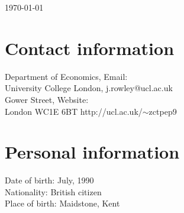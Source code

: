 \documentclass[margin,line]{res}
\makeatletter
\newcommand{\at}{\makeatletter @\makeatother}
\newcommand{\wavy}{\makeatletter $\sim$\makeatother}
\makeatother
\begin{document}
\begin{flushright}
{\small \today}
\end{flushright}
\begin{resume}
\section{\sc Contact information}
\begin{small}
Department of Economics, 												\hfill Email:\\
University College London,												\hfill j.rowley\at ucl.ac.uk\\
Gower Street, 															\hfill Website:\\
London WC1E 6BT															\hfill http://ucl.ac.uk/\wavy zctpep9\\
\end{small}
\section{\sc Personal information}
\begin{small}
\newlength{\myl}
\settowidth{\myl}{Date of birth: }
\newlength{\mym}
\settowidth{\mym}{Nationality: }
\newlength{\myn}
\settowidth{\myn}{Place of birth: }
Date of birth: \hspace{-\the\myl}\hspace{\the\myn}July, 1990\\
Nationality: \hspace{-\the\mym}\hspace{\the\myn}British citizen\\
Place of birth: \hspace{-\the\myn}\hspace{\the\myn}Maidstone, Kent\\
\end{small}

\end{resume}
\end{document}
